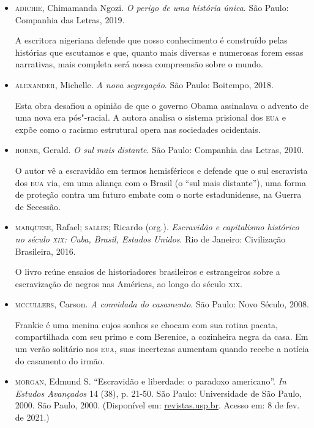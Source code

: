 \documentclass[12pt]{extarticle}
\begin{document}
\begin{itemize}
\item\textsc{adichie}, Chimamanda Ngozi. \textit{O perigo de uma história única}.
  São Paulo: Companhia das Letras, 2019.

A escritora nigeriana defende que nosso conhecimento é construído pelas
histórias que escutamos e que, quanto mais diversas e numerosas forem
essas narrativas, mais completa será nossa compreensão sobre o mundo.

\item\textsc{alexander}, Michelle. \textit{A nova segregação}. São Paulo: Boitempo,
  2018.

Esta obra desafiou a opinião de que o governo Obama assinalava o advento
de uma nova era pós"-racial. A autora analisa o sistema prisional dos \textsc{eua}
e expõe como o racismo estrutural opera nas sociedades ocidentais.

\item\textsc{horne}, Gerald. \textit{O sul mais distante}. São Paulo: Companhia das
  Letras, 2010.

O autor vê a escravidão em termos hemisféricos e defende que o sul
escravista dos \textsc{eua} via, em uma aliança com o Brasil (o ``sul mais
distante''), uma forma de proteção contra um futuro embate com o norte
estadunidense, na Guerra de Secessão.

\item\textsc{marquese}, Rafael; \textsc{salles}; Ricardo (org.). \textit{Escravidão e
  capitalismo histórico no século \textsc{xix}: Cuba, Brasil, Estados Unidos}.
  Rio de Janeiro: Civilização Brasileira, 2016.

O livro reúne ensaios de historiadores brasileiros e estrangeiros sobre
a escravização de negros nas Américas, ao longo do século \textsc{xix}.

\item\textsc{mccullers}, Carson. \textit{A convidada do casamento}. São Paulo: Novo
  Século, 2008.

Frankie é uma menina cujos sonhos se chocam com sua rotina pacata,
compartilhada com seu primo e com Berenice, a cozinheira negra da casa.
Em um verão solitário nos \textsc{eua}, suas incertezas aumentam quando recebe a
notícia do casamento do irmão.

\item\textsc{morgan}, Edmund S. ``Escravidão e liberdade: o paradoxo americano''.
  \emph{In} \textit{Estudos Avançados} 14 (38), p. 21-50. São Paulo:
  Universidade de São Paulo, 2000. São Paulo, 2000. (Disponível em:
  \href{http://www.revistas.usp.br/eav/article/view/9507}{revistas.usp.br}.
  Acesso em: 8 de fev. de 2021.)


\end{itemize}
\end{document}

